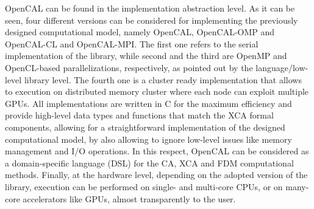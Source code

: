   OpenCAL can be found in the implementation abstraction level. As it
  can be seen, four different versions can be considered for
  implementing the previously designed computational model, namely
  OpenCAL, OpenCAL-OMP and OpenCAL-CL and OpenCAL-MPI. The first one refers to the   serial implementation of the library, while second and the third are OpenMP  and OpenCL-based parallelizations, respectively, as pointed out by
  the language/low-level library level. The fourth one is a cluster ready implementation that allows to execution on distributed memory cluster where each node can exploit multiple GPUs.
  All implementations are written in C for the maximum efficiency and provide high-level data types and functions that match the XCA formal components, allowing  for a straightforward implementation of the designed computational
  model, by also allowing to ignore low-level issues like memory
  management and I/O operations. In this respect, OpenCAL can be
  considered as a domain-specific language (DSL) for the CA, XCA and
  FDM computational methods. Finally, at the hardware level, depending
  on the adopted version of the library, execution can be performed on
  single- and multi-core CPUs, or on many-core accelerators like GPUs,
  almost transparently to the user.